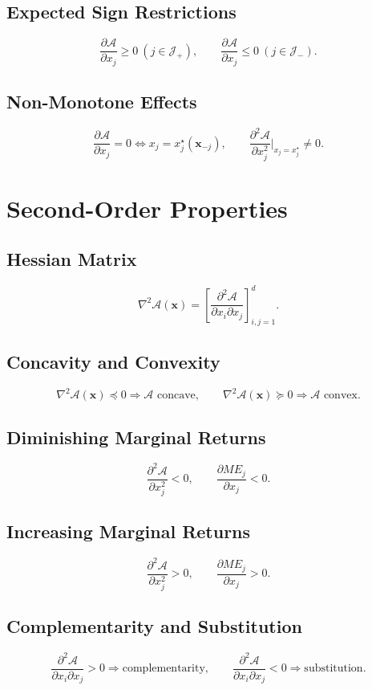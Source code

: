 \documentclass[11pt]{article}
\begin{document}
\subsection{Expected Sign Restrictions}
\[
\frac{\partial \mathcal{A}}{\partial x_j}\ge 0\ (j\in\mathcal{J}_+),
\qquad \frac{\partial \mathcal{A}}{\partial x_j}\le 0\ (j\in\mathcal{J}_-).
\]

\subsection{Non-Monotone Effects}
\[
\frac{\partial \mathcal{A}}{\partial x_j}=0 \iff x_j=x_j^{\star}(\bm{x}_{-j}),
\qquad \frac{\partial^2 \mathcal{A}}{\partial x_j^2}\bigg|_{x_j=x_j^{\star}}\neq 0.
\]

\section{Second-Order Properties}

\subsection{Hessian Matrix}
\[
\nabla^2\mathcal{A}(\bm{x})=\left[\frac{\partial^2\mathcal{A}}{\partial x_i\partial x_j}\right]_{i,j=1}^d.
\]

\subsection{Concavity and Convexity}
\[
\nabla^2\mathcal{A}(\bm{x})\preceq 0 \Rightarrow \mathcal{A}\text{ concave},
\qquad
\nabla^2\mathcal{A}(\bm{x})\succeq 0 \Rightarrow \mathcal{A}\text{ convex}.
\]

\subsection{Diminishing Marginal Returns}
\[
\frac{\partial^2\mathcal{A}}{\partial x_j^2}<0,
\qquad \frac{\partial ME_j}{\partial x_j}<0.
\]

\subsection{Increasing Marginal Returns}
\[
\frac{\partial^2\mathcal{A}}{\partial x_j^2}>0,
\qquad \frac{\partial ME_j}{\partial x_j}>0.
\]

\subsection{Complementarity and Substitution}
\[
\frac{\partial^2\mathcal{A}}{\partial x_i\partial x_j}>0\Rightarrow \text{complementarity},
\qquad
\frac{\partial^2\mathcal{A}}{\partial x_i\partial x_j}<0\Rightarrow \text{substitution}.
\]
\end{document}
